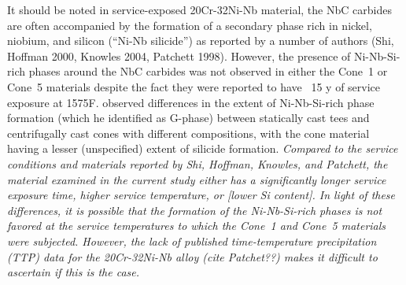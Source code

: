 It should be noted in service-exposed 20Cr-32Ni-Nb material, the NbC carbides are often accompanied by the formation of a secondary phase rich in nickel, niobium, and silicon (``Ni-Nb silicide'') as reported by a number of authors (Shi, Hoffman 2000, Knowles 2004, Patchett 1998). However, the presence of Ni-Nb-Si-rich phases around the NbC carbides was not observed in either the Cone~1 or Cone~5 materials despite the fact they were reported to have ~15 y of service exposure at 1575\textdegree{}F. \citet{hoffman_high_2000-1} observed differences in the extent of Ni-Nb-Si-rich phase formation (which he identified as G-phase) between statically cast tees and centrifugally cast cones with different compositions, with the cone material having a lesser (unspecified) extent of silicide formation. \emph{Compared to the service conditions and materials reported by Shi, Hoffman, Knowles, and Patchett, the material examined in the current study either has a significantly longer service exposure time, higher service temperature, or [lower Si content]. In light of these differences, it is possible that the formation of the Ni-Nb-Si-rich phases is not favored at the service temperatures to which the Cone~1 and Cone~5 materials were subjected. However, the lack of published time-temperature precipitation (TTP) data for the 20Cr-32Ni-Nb alloy (cite Patchet??) makes it difficult to ascertain if this is the case.}




